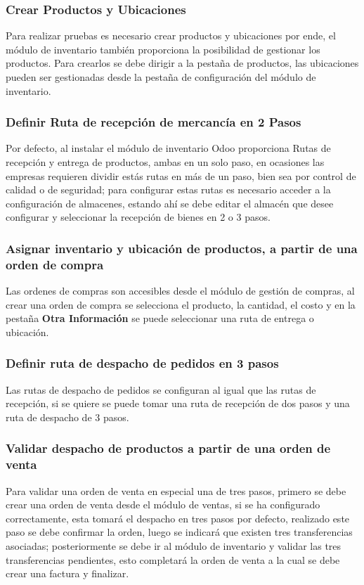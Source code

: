 \documentclass[11pt,letterpaper]{article}
\begin{document}
\subsubsection{Crear Productos y Ubicaciones}
Para realizar pruebas es necesario crear productos y ubicaciones por ende, el módulo de inventario también proporciona la posibilidad de gestionar los productos. Para crearlos se debe dirigir a la pestaña de productos, las ubicaciones pueden ser gestionadas desde la pestaña de configuración del módulo de inventario.
\subsubsection{Definir Ruta de recepción de mercancía en 2 Pasos}
Por defecto, al instalar el módulo de inventario Odoo proporciona Rutas de recepción y entrega de productos, ambas en un solo paso, en ocasiones las empresas requieren dividir estás rutas en más de un paso, bien sea por control de calidad o de seguridad; para configurar estas rutas es necesario acceder a la configuración de almacenes, estando ahí se debe editar el almacén que desee configurar y seleccionar la recepción de bienes en 2 o 3 pasos.
\subsubsection{Asignar inventario y ubicación de productos, a partir de una orden de compra}
Las ordenes de compras son accesibles desde el módulo de gestión de compras, al crear una orden de compra se selecciona el producto, la cantidad, el costo y en la pestaña \textbf{Otra Información} se puede seleccionar una ruta de entrega o ubicación.
\subsubsection{Definir ruta de despacho de pedidos en 3 pasos}
Las rutas de despacho de pedidos se configuran al igual que las rutas de recepción, si se quiere se puede tomar una ruta de recepción de dos pasos y una ruta de despacho de 3 pasos.
\subsubsection{Validar despacho de productos a partir de una orden de venta}
Para validar una orden de venta en especial una de tres pasos, primero se debe crear una orden de venta desde el módulo de ventas, si se ha configurado correctamente, esta tomará el despacho en tres pasos por defecto, realizado este paso se debe confirmar la orden, luego se indicará que existen tres transferencias asociadas; posteriormente se debe ir al módulo de inventario y validar las tres transferencias pendientes, esto completará la orden de venta a la cual se debe crear una factura y finalizar.
\end{document}
